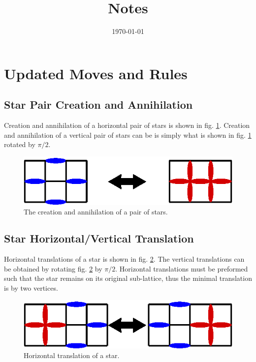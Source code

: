 \documentclass[aps,floatfix,11pt]{revtex4-1}
\begin{document}
\title{Notes}

\date{\today}

\begin{abstract}
    
\end{abstract}

\maketitle 

\section{Updated Moves and Rules}

\subsection{Star Pair Creation and Annihilation}

Creation and annihilation of a horizontal pair of stars is shown in fig.
\ref{fig:create_annihilate_pair}. Creation and annihilation of a vertical pair of stars can be
is simply what is shown in fig. \ref{fig:create_annihilate_pair} rotated by $\pi/2$.

\begin{figure}[h]
    \centering
    \includegraphics[width=8.5 cm]{create_annihilate_pair}
    \caption{The creation and annihilation of a pair of stars.
\label{fig:create_annihilate_pair}}
\end{figure}

\subsection{Star Horizontal/Vertical Translation}
Horizontal translations of a star is shown in fig. \ref{fig:move_right_left}. The vertical
translations can be obtained by rotating fig. \ref{fig:move_right_left} by $\pi/2$. Horizontal
translations must be preformed such that the star remains on its original sub-lattice, thus the
minimal translation is by two vertices.

\begin{figure}[h]
    \centering
    \includegraphics[width=8.5 cm]{move_right_left}
    \caption{Horizontal translation of a star.
\label{fig:move_right_left}}
\end{figure}
\end{document}
